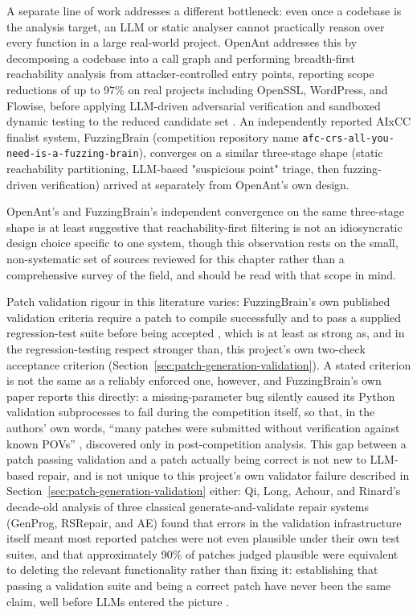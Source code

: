 \documentclass[12pt,a4paper]{report}
\begin{document}
A separate line of work addresses a different bottleneck: even once a codebase is the analysis target, an LLM or static analyser cannot practically reason over every function in a large real-world project. OpenAnt addresses this by decomposing a codebase into a call graph and performing breadth-first reachability analysis from attacker-controlled entry points, reporting scope reductions of up to 97\% on real projects including OpenSSL, WordPress, and Flowise, before applying LLM-driven adversarial verification and sandboxed dynamic testing to the reduced candidate set \cite{openant}. An independently reported AIxCC finalist system, FuzzingBrain \cite{fuzzingbrain} (competition repository name \texttt{afc-crs-all-you-need-is-a-fuzzing-brain}), converges on a similar three-stage shape (static reachability partitioning, LLM-based "suspicious point" triage, then fuzzing-driven verification) arrived at separately from OpenAnt's own design.

OpenAnt's and FuzzingBrain's independent convergence on the same three-stage shape is at least suggestive that reachability-first filtering is not an idiosyncratic design choice specific to one system, though this observation rests on the small, non-systematic set of sources reviewed for this chapter rather than a comprehensive survey of the field, and should be read with that scope in mind.

Patch validation rigour in this literature varies: FuzzingBrain's own published validation criteria require a patch to compile successfully and to pass a supplied regression-test suite before being accepted \cite{fuzzingbrain}, which is at least as strong as, and in the regression-testing respect stronger than, this project's own two-check acceptance criterion (Section~\ref{sec:patch-generation-validation}). A stated criterion is not the same as a reliably enforced one, however, and FuzzingBrain's own paper reports this directly: a missing-parameter bug silently caused its Python validation subprocesses to fail during the competition itself, so that, in the authors' own words, ``many patches were submitted without verification against known POVs'' \cite{fuzzingbrain}, discovered only in post-competition analysis. This gap between a patch passing validation and a patch actually being correct is not new to LLM-based repair, and is not unique to this project's own validator failure described in Section~\ref{sec:patch-generation-validation} either: Qi, Long, Achour, and Rinard's decade-old analysis of three classical generate-and-validate repair systems (GenProg, RSRepair, and AE) found that errors in the validation infrastructure itself meant most reported patches were not even plausible under their own test suites, and that approximately 90\% of patches judged plausible were equivalent to deleting the relevant functionality rather than fixing it: establishing that passing a validation suite and being a correct patch have never been the same claim, well before LLMs entered the picture \cite{qiplausibility}.
\end{document}
